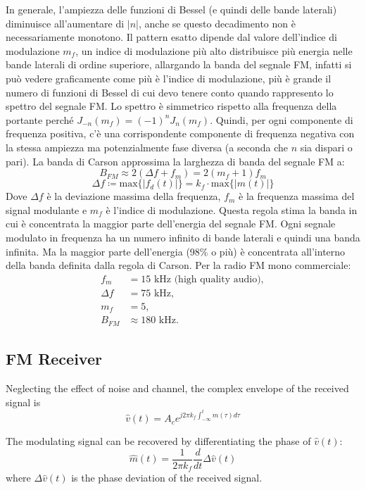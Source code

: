 In generale, l'ampiezza delle funzioni di Bessel (e quindi delle bande laterali) diminuisce all'aumentare di \( |n| \), anche se questo decadimento non è necessariamente monotono.
Il pattern esatto dipende dal valore dell'indice di modulazione \( m_f \), un indice di modulazione più alto distribuisce più energia nelle bande laterali di ordine superiore, allargando la banda del segnale FM,
infatti si può vedere graficamente come più è l'indice di modulazione, più è grande il numero di funzioni di Bessel di cui devo tenere conto quando rappresento lo spettro del segnale FM.
Lo spettro è simmetrico rispetto alla frequenza della portante perché \( J_{-n}(m_f) = (-1)^n J_n(m_f) \). Quindi, per ogni componente di frequenza positiva, c'è una corrispondente componente di frequenza negativa con la stessa ampiezza ma potenzialmente fase diversa (a seconda che \( n \) sia dispari o pari).
La banda di Carson approssima la larghezza di banda del segnale FM a:
\[
    B_{FM} \approx 2(\Delta f + f_{m}) = 2(m_f + 1) f_{m}
\]
\[
    \Delta f \coloneqq \text{max} \{ | f_d(t) | \} = k_f \cdot \text{max} \{ | m(t) | \}
\]
Dove \( \Delta f \) è la deviazione massima della frequenza, \( f_{m} \) è la frequenza massima del signal modulante e \( m_f \) è l'indice di modulazione.
Questa regola stima la banda in cui è concentrata la maggior parte dell'energia del segnale FM.
Ogni segnale modulato in frequenza ha un numero infinito di bande laterali e quindi una banda infinita. Ma la maggior parte dell'energia (98\% o più) è concentrata all'interno della banda definita dalla regola di Carson. Per la radio FM mono commerciale:
\begin{align*}
f_m &= 15 \text{ kHz (high quality audio)}, \\
\Delta f &= 75 \text{ kHz}, \\
m_f &= 5, \\
B_{FM} &\approx 180 \text{ kHz}.
\end{align*}

\subsection*{FM Receiver}

Neglecting the effect of noise and channel, the complex envelope of the received signal is
\[ \hat{v}(t) = A_c e^{j2\pi k_f \int_{-\infty}^{t} m(\tau) d\tau} \]

The modulating signal can be recovered by differentiating the phase of \( \hat{v}(t) \):
\[ \hat{m}(t) = \frac{1}{2\pi k_f} \frac{d}{dt} \Delta \hat{v}(t) \]
where \( \Delta \hat{v}(t) \) is the phase deviation of the received signal.

